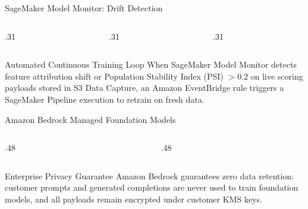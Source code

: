\documentclass[aspectratio=169,10pt]{beamer}
\begin{document}
\begin{frame}{SageMaker Model Monitor: Drift Detection}
  \begin{columns}[T,onlytextwidth]
    \begin{column}{.31\textwidth}
    \end{column}
    \begin{column}{.31\textwidth}
    \end{column}
    \begin{column}{.31\textwidth}
    \end{column}
  \end{columns}
  \vspace{0.20cm}
  \begin{CaseStudyBox}{Automated Continuous Training Loop}
    When SageMaker Model Monitor detects feature attribution shift or Population Stability Index (PSI) $> 0.2$ on live scoring payloads stored in S3 Data Capture, an Amazon EventBridge rule triggers a SageMaker Pipeline execution to retrain on fresh data.
  \end{CaseStudyBox}
\end{frame}


\begin{frame}{Amazon Bedrock Managed Foundation Models}
  \begin{columns}[T,onlytextwidth]
    \begin{column}{.48\textwidth}
    \end{column}
    \begin{column}{.48\textwidth}
    \end{column}
  \end{columns}
  \vspace{0.20cm}
  \begin{ConceptBox}{Enterprise Privacy Guarantee}
    Amazon Bedrock guarantees zero data retention: customer prompts and generated completions are never used to train foundation models, and all payloads remain encrypted under customer KMS keys.
  \end{ConceptBox}
\end{frame}
\end{document}
